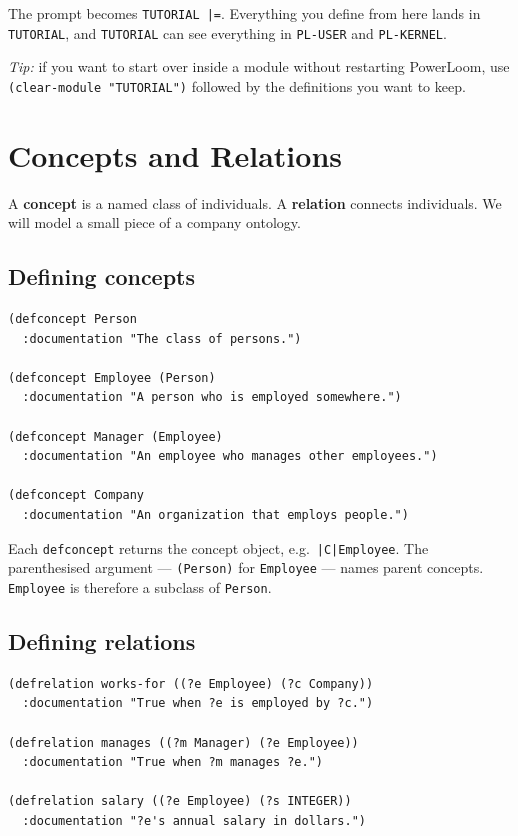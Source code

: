 \documentclass[11pt,letterpaper]{article}
\newcommand{\cmd}[1]{\texttt{#1}}
\newcommand{\prompt}[1]{\textcolor{plprompt}{\texttt{#1}}}
\begin{document}
\noindent The prompt becomes \prompt{TUTORIAL |=}. Everything you define
from here lands in \cmd{TUTORIAL}, and \cmd{TUTORIAL} can see everything in
\cmd{PL-USER} and \cmd{PL-KERNEL}.

\textit{Tip:} if you want to start over inside a module without restarting
PowerLoom, use \cmd{(clear-module "TUTORIAL")} followed by the definitions
you want to keep.

\section{Concepts and Relations}
\label{sec:concepts}

A \textbf{concept} is a named class of individuals. A \textbf{relation}
connects individuals. We will model a small piece of a company ontology.

\subsection{Defining concepts}

\begin{lstlisting}
(defconcept Person
  :documentation "The class of persons.")

(defconcept Employee (Person)
  :documentation "A person who is employed somewhere.")

(defconcept Manager (Employee)
  :documentation "An employee who manages other employees.")

(defconcept Company
  :documentation "An organization that employs people.")
\end{lstlisting}

\noindent Each \cmd{defconcept} returns the concept object, e.g.\ \cmd{|C|Employee}.
The parenthesised argument --- \cmd{(Person)} for \cmd{Employee} --- names
parent concepts. \cmd{Employee} is therefore a subclass of \cmd{Person}.

\subsection{Defining relations}

\begin{lstlisting}
(defrelation works-for ((?e Employee) (?c Company))
  :documentation "True when ?e is employed by ?c.")

(defrelation manages ((?m Manager) (?e Employee))
  :documentation "True when ?m manages ?e.")

(defrelation salary ((?e Employee) (?s INTEGER))
  :documentation "?e's annual salary in dollars.")
\end{lstlisting}
\end{document}
